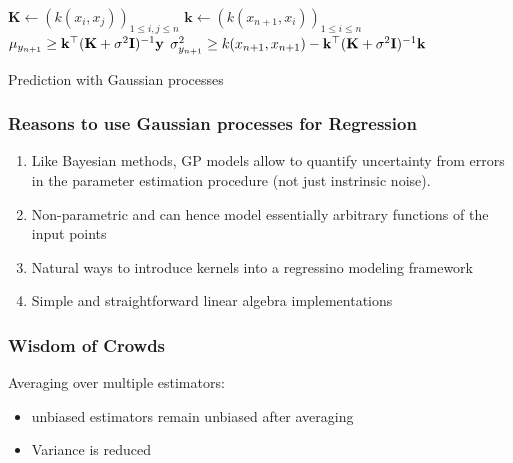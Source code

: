 \begin{algorithm}[H]
				\vspace{1em}
	$\mathbf K \gets (k(x_i, x_j))_{1\leq i,j \leq n}$	{\scriptsize {}} 
	$\mathbf k \gets (k(x_{n+1}, x_i))_{1\leq i\leq n}$ {\scriptsize {}}
	$\mu_{y_{n+1}} \geq {\mathbf k}^\top(\mathbf K + \sigma^2\mathbf I)^{-1}\mathbf y$ {\scriptsize {}}
	$\sigma^2_{y_{n+1}} \geq k(x_{n+1}, x_{n + 1}) - {\mathbf k}^\top(\mathbf K + \sigma^2\mathbf I)^{-1}\mathbf k$  {\scriptsize {}}
	\vspace{1em}
	 {\scriptsize {}}
	\caption{Prediction with Gaussian processes}	
\end{algorithm}


\subsubsection{Reasons to use Gaussian processes for Regression}
\begin{enumerate}
	\item Like Bayesian methods, GP models allow to quantify uncertainty from errors in the parameter estimation procedure (not just instrinsic noise).
	\item Non-parametric and can hence model essentially arbitrary functions of the input points
	\item Natural ways to introduce kernels into a regressino modeling framework
	\item Simple and straightforward linear algebra implementations
\end{enumerate}

\subsubsection{Wisdom of Crowds}
Averaging over multiple estimators:
\begin{itemize}
	\item unbiased estimators remain unbiased after averaging
	\item Variance is reduced
\end{itemize}


	
	
	
	
	
	
	
	
